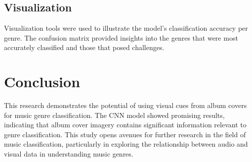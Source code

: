 \documentclass[12pt]{article}
\begin{document}
\subsection{Visualization}
Visualization tools were used to illustrate the model's classification accuracy per genre. The confusion matrix provided insights into the genres that were most accurately classified and those that posed challenges.

\section{Conclusion}
This research demonstrates the potential of using visual cues from album covers for music genre classification. The CNN model showed promising results, indicating that album cover imagery contains significant information relevant to genre classification. This study opens avenues for further research in the field of music classification, particularly in exploring the relationship between audio and visual data in understanding music genres.
\end{document}
